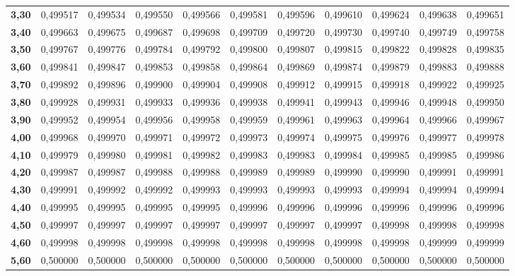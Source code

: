 \begin{tabular}{|r||rrrrr|rrrrr|}
{\bf 3,30} &   0,499517 &   0,499534 &   0,499550 &   0,499566 &   0,499581 &   0,499596 &   0,499610 &   0,499624 &   0,499638 &   0,499651 \\

{\bf 3,40} &   0,499663 &   0,499675 &   0,499687 &   0,499698 &   0,499709 &   0,499720 &   0,499730 &   0,499740 &   0,499749 &   0,499758 \\
\hline
{\bf 3,50} &   0,499767 &   0,499776 &   0,499784 &   0,499792 &   0,499800 &   0,499807 &   0,499815 &   0,499822 &   0,499828 &   0,499835 \\

{\bf 3,60} &   0,499841 &   0,499847 &   0,499853 &   0,499858 &   0,499864 &   0,499869 &   0,499874 &   0,499879 &   0,499883 &   0,499888 \\

{\bf 3,70} &   0,499892 &   0,499896 &   0,499900 &   0,499904 &   0,499908 &   0,499912 &   0,499915 &   0,499918 &   0,499922 &   0,499925 \\

{\bf 3,80} &   0,499928 &   0,499931 &   0,499933 &   0,499936 &   0,499938 &   0,499941 &   0,499943 &   0,499946 &   0,499948 &   0,499950 \\

{\bf 3,90} &   0,499952 &   0,499954 &   0,499956 &   0,499958 &   0,499959 &   0,499961 &   0,499963 &   0,499964 &   0,499966 &   0,499967 \\
\hline \hline
{\bf 4,00} &   0,499968 &   0,499970 &   0,499971 &   0,499972 &   0,499973 &   0,499974 &   0,499975 &   0,499976 &   0,499977 &   0,499978 \\

{\bf 4,10} &   0,499979 &   0,499980 &   0,499981 &   0,499982 &   0,499983 &   0,499983 &   0,499984 &   0,499985 &   0,499985 &   0,499986 \\

{\bf 4,20} &   0,499987 &   0,499987 &   0,499988 &   0,499988 &   0,499989 &   0,499989 &   0,499990 &   0,499990 &   0,499991 &   0,499991 \\

{\bf 4,30} &   0,499991 &   0,499992 &   0,499992 &   0,499993 &   0,499993 &   0,499993 &   0,499993 &   0,499994 &   0,499994 &   0,499994 \\

{\bf 4,40} &   0,499995 &   0,499995 &   0,499995 &   0,499995 &   0,499996 &   0,499996 &   0,499996 &   0,499996 &   0,499996 &   0,499996 \\
\hline
{\bf 4,50} &   0,499997 &   0,499997 &   0,499997 &   0,499997 &   0,499997 &   0,499997 &   0,499997 &   0,499998 &   0,499998 &   0,499998 \\

{\bf 4,60} &   0,499998 &   0,499998 &   0,499998 &   0,499998 &   0,499998 &   0,499998 &   0,499998 &   0,499998 &   0,499999 &   0,499999 \\

{\bf 5,60} &   0,500000 &   0,500000 &   0,500000 &   0,500000 &   0,500000 &   0,500000 &   0,500000 &   0,500000 &   0,500000 &   0,500000 \\
\hline
\end{tabular}  

